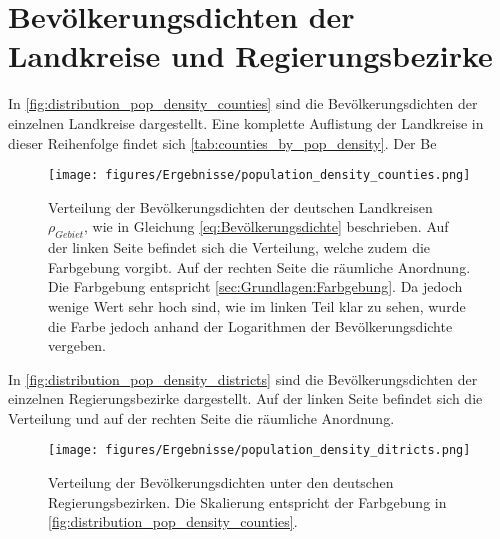 \section{Bevölkerungsdichten der Landkreise und Regierungsbezirke}
In \autoref{fig:distribution_pop_density_counties} sind die Bevölkerungsdichten der einzelnen Landkreise dargestellt. Eine komplette Auflistung der Landkreise in dieser Reihenfolge findet sich \autoref{tab:counties_by_pop_density}. Der Be

\begin{figure}[H]
    \centering
    \texttt{[image: figures/Ergebnisse/population\_density\_counties.png]}
    \caption{Verteilung der Bevölkerungsdichten  der deutschen Landkreisen $\rho_{Gebiet}$, wie in Gleichung \autoref{eq:Bevölkerungsdichte} beschrieben. Auf der linken Seite befindet sich die Verteilung, welche zudem die Farbgebung vorgibt. Auf der rechten Seite die räumliche Anordnung. Die Farbgebung entspricht \autoref{sec:Grundlagen:Farbgebung}. Da jedoch wenige Wert sehr hoch sind, wie im linken Teil klar zu sehen, wurde die Farbe jedoch anhand der Logarithmen der Bevölkerungsdichte vergeben.}
    \label{fig:distribution_pop_density_counties}
\end{figure}

In \autoref{fig:distribution_pop_density_districts} sind die Bevölkerungsdichten der einzelnen Regierungsbezirke dargestellt. Auf der linken Seite befindet sich die Verteilung und auf der rechten Seite die räumliche Anordnung.

\begin{figure}[H]
    \centering
    \texttt{[image: figures/Ergebnisse/population\_density\_ditricts.png]}
    \caption{Verteilung der Bevölkerungsdichten unter den deutschen Regierungsbezirken. Die Skalierung entspricht der Farbgebung in \autoref{fig:distribution_pop_density_counties}.}
    \label{fig:distribution_pop_density_districts}
\end{figure}
